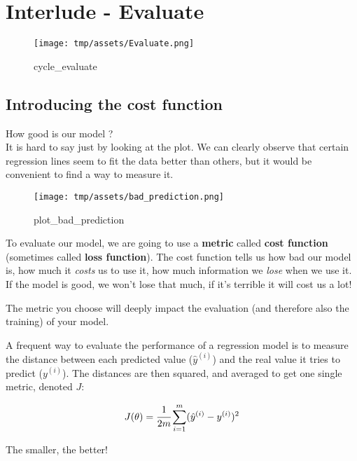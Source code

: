 \documentclass[]{article}
\begin{document}
\clearpage

\hypertarget{interlude---evaluate-1}{%
\section{Interlude - Evaluate}\label{interlude---evaluate-1}}

\begin{figure}
\centering
\texttt{[image: tmp/assets/Evaluate.png]}
\caption{cycle\_evaluate}
\end{figure}

\hypertarget{introducing-the-cost-function}{%
\subsection{Introducing the cost
function}\label{introducing-the-cost-function}}

How good is our model ?\\
It is hard to say just by looking at the plot. We can clearly observe
that certain regression lines seem to fit the data better than others,
but it would be convenient to find a way to measure it.

\begin{figure}
\centering
\texttt{[image: tmp/assets/bad\_prediction.png]}
\caption{plot\_bad\_prediction}
\end{figure}

To evaluate our model, we are going to use a \textbf{metric} called
\textbf{cost function} (sometimes called \textbf{loss function}). The
cost function tells us how bad our model is, how much it \emph{costs} us
to use it, how much information we \emph{lose} when we use it. If the
model is good, we won't lose that much, if it's terrible it will cost us
a lot!

The metric you choose will deeply impact the evaluation (and therefore
also the training) of your model.

A frequent way to evaluate the performance of a regression model is to
measure the distance between each predicted value (\(\hat{y}^{(i)}\))
and the real value it tries to predict (\({y}^{(i)}\)). The distances
are then squared, and averaged to get one single metric, denoted \(J\):

\large

\[
J(\theta) = \cfrac{1}{2m}\sum_{i=1}^{m}(\hat{y}^{(i)} - y^{(i)})^2
\] \normalsize

The smaller, the better!
\end{document}
